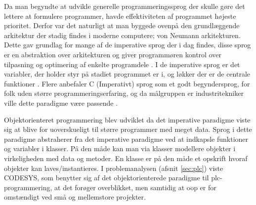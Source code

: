 Da man begyndte at udvikle generelle programmeringssprog der skulle gøre det lettere at formulere programmer, havde effektiviteten af programmet højeste prioritet. Derfor var det naturligt at man byggede ovenpå den grundlæggende arkitektur der stadig findes i moderne computere; von Neumann arkitekturen. Dette gav grundlag for mange af de imperative sprog der i dag findes, disse sprog er en abstraktion over arkitekturen og giver programmøren kontrol over tilpasning og optimering af enkelte programdele \cite[38-39]{Sebesta_2013}. I de imperative sprog er det variabler, der holder styr på stadiet programmet er i, og løkker der er de centrale funktioner \cite{Sebesta_2013}. Flere anbefaler C (Imperativt) sprog som et godt begyndersprog, for folk uden større programmeringserfaring, og da målgruppen er industritekniker ville dette paradigme være passende \cite{c_is_easy}.

Objektorienteret programmering blev udviklet da det imperative paradigme viste sig at blive for uoverskueligt til større programmer med meget data. Sprog i dette paradigme abstraherer fra det imperative paradigme ved at indkapsle funktioner og variabler i klasser. På den måde kan man via klasser modellere objekter i virkeligheden med data og metoder. En klasse er på den måde et opskrift hvoraf objekter kan laves/instantieres. I problemanalysen (afsnit \ref{sec:plc}) viste CODESYS, som benytter sig af det objektorienterede paradigme til \gls{plc}-programmering, at det forøger overblikket, men samtidig at \gls{oop} er for omstændigt ved små og mellemstore projekter.



